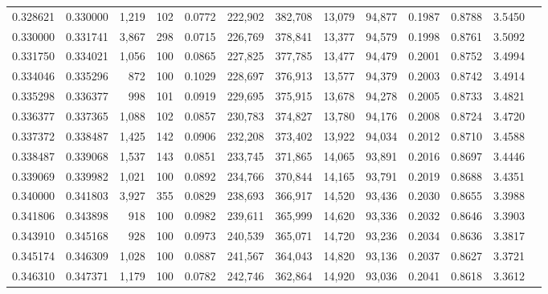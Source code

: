 \begin{tabular}{rrrrrrrrrrrrr}
0.328621 & 0.330000 & 1,219 & 102 &                                     0.0772 & 222,902 & 382,708 &  13,079 &  94,877 & 0.1987 & 0.8788 & 3.5450 \\
0.330000 & 0.331741 & 3,867 & 298 &                                     0.0715 & 226,769 & 378,841 &  13,377 &  94,579 & 0.1998 & 0.8761 & 3.5092 \\
0.331750 & 0.334021 & 1,056 & 100 &                                     0.0865 & 227,825 & 377,785 &  13,477 &  94,479 & 0.2001 & 0.8752 & 3.4994 \\
0.334046 & 0.335296 &   872 & 100 &                                     0.1029 & 228,697 & 376,913 &  13,577 &  94,379 & 0.2003 & 0.8742 & 3.4914 \\
0.335298 & 0.336377 &   998 & 101 &                                     0.0919 & 229,695 & 375,915 &  13,678 &  94,278 & 0.2005 & 0.8733 & 3.4821 \\
0.336377 & 0.337365 & 1,088 & 102 &                                     0.0857 & 230,783 & 374,827 &  13,780 &  94,176 & 0.2008 & 0.8724 & 3.4720 \\
0.337372 & 0.338487 & 1,425 & 142 &                                     0.0906 & 232,208 & 373,402 &  13,922 &  94,034 & 0.2012 & 0.8710 & 3.4588 \\
0.338487 & 0.339068 & 1,537 & 143 &                                     0.0851 & 233,745 & 371,865 &  14,065 &  93,891 & 0.2016 & 0.8697 & 3.4446 \\
0.339069 & 0.339982 & 1,021 & 100 &                                     0.0892 & 234,766 & 370,844 &  14,165 &  93,791 & 0.2019 & 0.8688 & 3.4351 \\
0.340000 & 0.341803 & 3,927 & 355 &                                     0.0829 & 238,693 & 366,917 &  14,520 &  93,436 & 0.2030 & 0.8655 & 3.3988 \\
0.341806 & 0.343898 &   918 & 100 &                                     0.0982 & 239,611 & 365,999 &  14,620 &  93,336 & 0.2032 & 0.8646 & 3.3903 \\
0.343910 & 0.345168 &   928 & 100 &                                     0.0973 & 240,539 & 365,071 &  14,720 &  93,236 & 0.2034 & 0.8636 & 3.3817 \\
0.345174 & 0.346309 & 1,028 & 100 &                                     0.0887 & 241,567 & 364,043 &  14,820 &  93,136 & 0.2037 & 0.8627 & 3.3721 \\
0.346310 & 0.347371 & 1,179 & 100 &                                     0.0782 & 242,746 & 362,864 &  14,920 &  93,036 & 0.2041 & 0.8618 & 3.3612 \\

\end{tabular}
